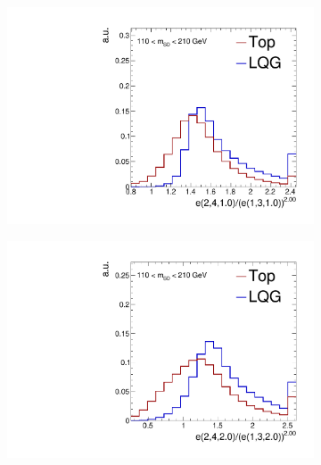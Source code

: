 \begin{figure}[]
    \begin{center}
        \begin{subfigure}[t]{0.32\textwidth}
            \includegraphics[width=\textwidth]{figures/toptagging/shapes/mass_ratio_24101310.pdf}
        \end{subfigure}
        \begin{subfigure}[t]{0.32\textwidth}
            \includegraphics[width=\textwidth]{figures/toptagging/shapes/mass_ratio_24201320.pdf}
        \end{subfigure}
        \begin{subfigure}[t]{0.32\textwidth}

\end{subfigure}
\end{center}
\end{figure}
